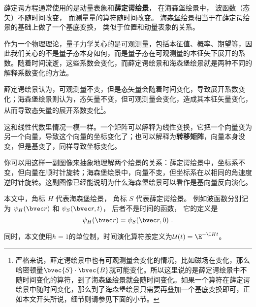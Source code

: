 

薛定谔方程通常使用的是动量表象和\textbf{薛定谔绘景}， 在海森堡绘景中， 波函数（态矢）不随时间改变， 而测量量的算符随时间改变。 海森堡绘景相当于在薛定谔绘景的基础上做了一个基底变换， 类似于位置和动量表象的关系。



作为一个物理理论，量子力学关心的是可观测量，包括本征值、概率、期望等，因此我们关心的不是量子态本身如何，而是量子态在可观测量的本征矢下展开的系数。随着时间流逝，这些系数会变化，而薛定谔绘景和海森堡绘景就是两种不同的解释系数变化的方法。

薛定谔绘景认为，可观测量不变，但是态矢量会随着时间变化，导致展开系数变化；海森堡绘景则认为，态矢量不变，但可观测量会变化，造成其本征矢量变化，从而导致态矢量的展开系数变化\footnote{严格来说，薛定谔绘景中也有可观测量会变化的情况，比如磁场在变化，那么哈密顿量$\bvec{S}\cdot \bvec{B}$就可能变化。所以这里说的是薛定谔绘景中不随时间变化的算符，到了海森堡绘景就会随时间变化。如果一个算符在薛定谔绘景中随时间变化，那么到了海森堡绘景只需要再叠加一个基底变换即可，正如本文开头所说，细节则请参见下面的小节。}。

这和线性代数里情况一模一样。一个矩阵可以解释为线性变换，它把一个向量变为另一个向量，导致这个向量的坐标变化了；也可以解释为\textbf{转移矩阵}，向量本身没变，但是基变了，同样导致坐标变化。

你可以用这样一副图像来抽象地理解两个绘景的关系：薛定谔绘景中，坐标系不变，但向量在顺时针旋转；海森堡绘景中，向量不变，但坐标系在以相同的角速度逆时针旋转。这副图像已经能说明为什么海森堡绘景可以看作是基向量反向演化。

本文中，角标 $H$ 代表海森堡绘景， 角标 $S$ 代表薛定谔绘景。 例如波函数分别记为 $\psi_H(\bvec r)$ 和 $\psi_S(\bvec r, t)$， 后者不是时间的函数， 它的定义是
\begin{equation}
\psi_H(\bvec r) = \psi_S(\bvec r, 0)~.
\end{equation}

同时，本文使用$\hbar=1$的单位制，时间演化算符按定义为$\mathcal{U}(t)=\E^{-\I H t}$。



